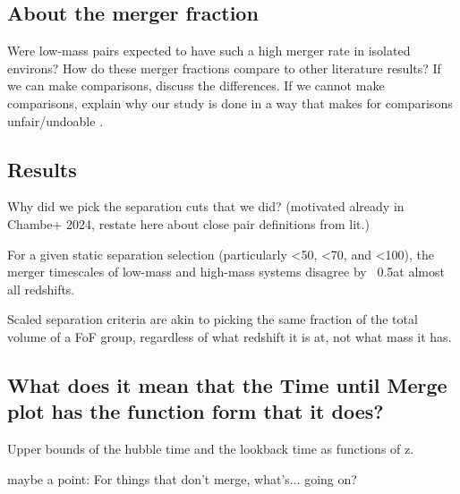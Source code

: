 \documentclass[twocolumn,linenumbers]{aastex631}
\begin{document}
\subsection{About the merger fraction}
Were low-mass pairs expected to have such a high merger rate in isolated environs? 
How do these merger fractions compare to other literature results? 
If we can make comparisons, discuss the differences. 
If we cannot make comparisons, explain why our study is done in a way that makes for comparisons unfair/undoable .

\subsection{Results}

Why did we pick the separation cuts that we did? (motivated already in Chambe+ 2024, restate here about close pair definitions from lit.)

For a given static separation selection (particularly <50, <70, and <100), the merger timescales of low-mass and high-mass systems disagree by ~0.5\Gyr at almost all redshifts.

Scaled separation criteria are akin to picking the same fraction of the total volume of a FoF group, regardless of what redshift it is at, not what mass it has. 


\subsection{What does it mean that the Time until Merge plot has the function form that it does?}
Upper bounds of the hubble time and the lookback time as functions of z.

maybe a point: 
For things that don't merge, what's... going on? 



\end{document}
